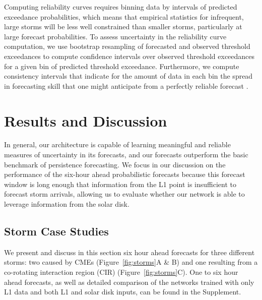\documentclass[draft,linenumbers]{agujournal2018}
\begin{document}
Computing reliability curves requires binning data by intervals of predicted exceedance probabilities, which means that empirical statistics for infrequent, large storms will be less well constrained than smaller storms, particularly at large forecast probabilities. To assess uncertainty in the reliability curve computation, we use bootstrap resampling of forecasted and observed threshold exceedances to compute confidence intervals over observed threshold exceedances for a given bin of predicted threshold exceedance. Furthermore, we compute consistency intervals that indicate for the amount of data in each bin the spread in forecasting skill that one might anticipate from a perfectly reliable forecast \citep{Brocker2007}.

\section{Results and Discussion}
% 
In general, our architecture is capable of learning meaningful and reliable measures of uncertainty in its forecasts, and our forecasts outperform the basic benchmark of persistence forecasting. We focus in our discussion on the performance of the six-hour ahead probabilistic forecasts because this forecast window is long enough that information from the L1 point is insufficient to forecast storm arrivals, allowing us to evaluate whether our network is able to leverage information from the solar disk.  

\subsection{Storm Case Studies}
We present and discuss in this section six hour ahead forecasts for three different storms: two caused by CMEs (Figure~\ref{fig:storms}A \& B) and one resulting from a co-rotating interaction region (CIR) (Figure~\ref{fig:storms}C). One to six hour ahead forecasts, as well as detailed comparison of the networks trained with only L1 data and both L1 and solar disk inputs, can be found in the Supplement.
\end{document}
